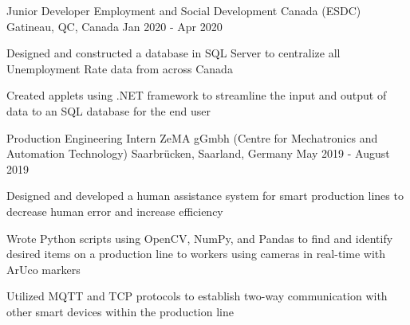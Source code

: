 \begin{cventries}
{\begin{cvitems}
      \end{cvitems}
    }
  \cventry
    {Junior Developer} %
    {Employment and Social Development Canada (ESDC)} %
    {Gatineau, QC, Canada} %
    {Jan 2020 - Apr 2020} %
    {
      \begin{cvitems} %
\item Designed and constructed a database in SQL Server to centralize all Unemployment Rate data from across Canada
\item Created applets using .NET framework to streamline the input and output of data to an SQL database for the end user
      \end{cvitems}
    }

  \cventry
    {Production Engineering Intern} %
    {ZeMA gGmbh (Centre for Mechatronics and Automation Technology)} %
    {Saarbrücken, Saarland, Germany} %
    { May 2019 - August 2019} %
    {
      \begin{cvitems} %
\item Designed and developed a human assistance system for smart production lines to decrease human error and increase efficiency
\item Wrote Python scripts using OpenCV, NumPy, and Pandas to find and identify desired items on a production line to workers using cameras in real-time with ArUco markers
\item Utilized MQTT and TCP protocols to establish two-way communication with other smart devices within the production line
      \end{cvitems}
    }

\end{cventries}
